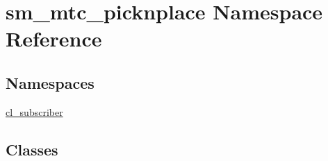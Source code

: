 \hypertarget{namespacesm__mtc__picknplace}{}\section{sm\+\_\+mtc\+\_\+picknplace Namespace Reference}
\label{namespacesm__mtc__picknplace}
\subsection*{Namespaces}
\begin{DoxyCompactItemize}
\item 
 \hyperlink{namespacesm__mtc__picknplace_1_1cl__subscriber}{cl\+\_\+subscriber}
\end{DoxyCompactItemize}
\subsection*{Classes}
